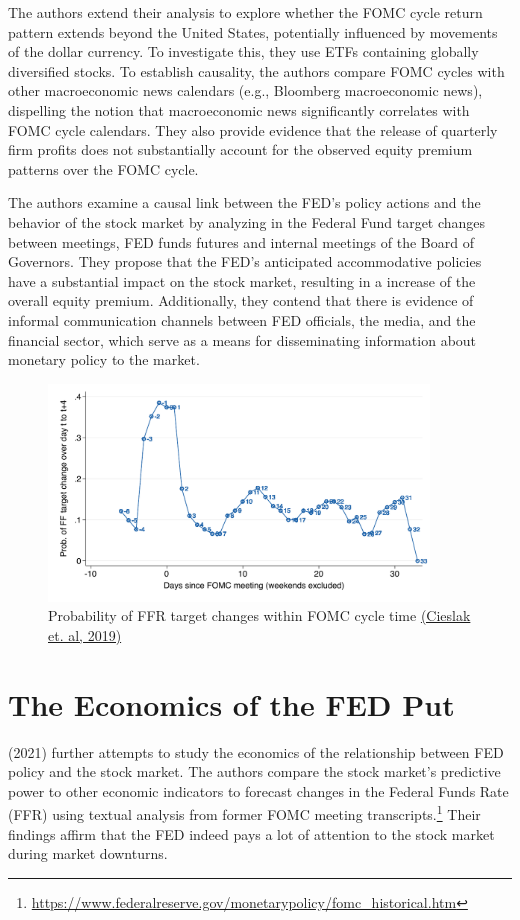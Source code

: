The authors extend their analysis to explore whether the FOMC cycle return pattern extends beyond the United States, potentially influenced by movements of the dollar currency. To investigate this, they use ETFs containing globally diversified stocks. To establish causality, the authors compare FOMC cycles with other macroeconomic news calendars (e.g., Bloomberg macroeconomic news), dispelling the notion that macroeconomic news significantly correlates with FOMC cycle calendars. They also provide evidence that the release of quarterly firm profits does not substantially account for the observed equity premium patterns over the FOMC cycle.

The authors examine a causal link between the FED's policy actions and the behavior of the stock market by analyzing in the Federal Fund target changes between meetings,  FED funds futures and internal meetings of the Board of Governors. They propose that the FED's anticipated accommodative policies have a substantial impact on the stock market, resulting in a increase of the overall equity premium.  Additionally, they contend that there is evidence of informal communication channels between FED officials, the media, and the financial sector, which serve as a means for disseminating information about monetary policy to the market.

\begin{figure}[h]
    \centering
    \label{cies19_fig3A}
    \includegraphics[width=0.9\textwidth]{figures/cies19/fig3A}
    \caption{Probability of FFR target changes within FOMC cycle time  \hyperref[item:cieslak_stock_2019]{(Cieslak et. al, 2019)}}
\end{figure}

\pagebreak

\section{The Economics of the FED Put}
\cite{cieslak_economics_2021} (2021) further attempts to study the economics of the relationship between FED policy and the stock market. The authors compare the stock market's predictive power to other economic indicators to forecast changes in the Federal Funds Rate (FFR) using textual analysis from former FOMC meeting transcripts.\footnote{\url{https://www.federalreserve.gov/monetarypolicy/fomc_historical.htm}} Their findings affirm that the FED indeed pays a lot of attention to the stock market during market downturns.

